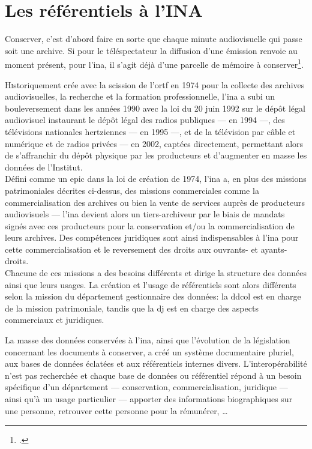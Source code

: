 \chapter{\label{I-B}Les référentiels à l’INA}

\begin{citationLongue}
	Conserver, c’est d’abord faire en sorte que chaque minute audiovisuelle qui passe soit une archive. Si pour le téléspectateur la diffusion d’une émission renvoie au moment présent, pour l’\ac{ina}, il s’agit déjà d’une parcelle de mémoire à conserver\footcite[p.45]{hoog_lina_2006}.
\end{citationLongue}
\lettrine{H}istoriquement crée avec la scission de l'\ac{ortf} en 1974 pour la collecte des archives audiovisuelles, la recherche et la formation professionnelle, l'\ac{ina} a subi un bouleversement dans les années 1990 avec la loi du 20 juin 1992 sur le dépôt légal audiovisuel instaurant le dépôt légal des radios publiques --- en 1994 ---, des télévisions nationales hertziennes --- en 1995 ---, et de la télévision par câble et numérique et de radios privées --- en 2002, captées directement, permettant alors de s'affranchir du dépôt physique par les producteurs et d'augmenter en masse les données de l'Institut.\\

Défini comme un \ac{epic} dans la loi de création de 1974, l'\ac{ina} a, en plus des missions patrimoniales décrites ci-dessus, des missions commerciales comme la commercialisation des archives ou bien la vente de services auprès de producteurs audiovisuels --- l'\ac{ina} devient alors un tiers-archiveur par le biais de mandats signés avec ces producteurs pour la conservation et/ou la commercialisation de leurs archives. Des compétences juridiques sont ainsi indispensables à l'\ac{ina} pour cette commercialisation et le reversement des droits aux ouvrants- et ayants-droits.\\

Chacune de ces missions a des besoins différents et dirige la structure des données  ainsi que leurs usages. La création et l'usage de référentiels sont alors différents selon la mission du département gestionnaire des données: la \ac{ddcol} est en charge de la mission patrimoniale, tandis que la \ac{dj} est en charge des aspects commerciaux et juridiques.





\bigskip
\bigskip
\bigskip

La masse des données conservées à l'\ac{ina}, ainsi que l'évolution de la législation concernant les documents à conserver, a créé un système documentaire pluriel, aux bases de données éclatées et aux référentiels internes divers. L'interopérabilité n'est pas recherchée et chaque base de données ou référentiel répond à un besoin spécifique d'un département --- conservation, commercialisation, juridique --- ainsi qu'à un usage particulier --- apporter des informations biographiques sur une personne, retrouver cette personne pour la rémunérer, \dots